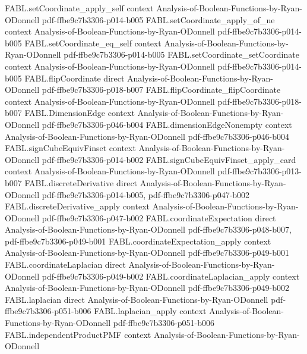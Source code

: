 \begin{theorem}
\proofstep
  {FABL.setCoordinate_apply_self}
  {context}
  {Analysis-of-Boolean-Functions-by-Ryan-ODonnell}
  {pdf-ffbe9c7b3306-p014-b005}
\proofstep
  {FABL.setCoordinate_apply_of_ne}
  {context}
  {Analysis-of-Boolean-Functions-by-Ryan-ODonnell}
  {pdf-ffbe9c7b3306-p014-b005}
\proofstep
  {FABL.setCoordinate_eq_self}
  {context}
  {Analysis-of-Boolean-Functions-by-Ryan-ODonnell}
  {pdf-ffbe9c7b3306-p014-b005}
\proofstep
  {FABL.setCoordinate_setCoordinate}
  {context}
  {Analysis-of-Boolean-Functions-by-Ryan-ODonnell}
  {pdf-ffbe9c7b3306-p014-b005}
\proofstep
  {FABL.flipCoordinate}
  {direct}
  {Analysis-of-Boolean-Functions-by-Ryan-ODonnell}
  {pdf-ffbe9c7b3306-p018-b007}
\proofstep
  {FABL.flipCoordinate_flipCoordinate}
  {context}
  {Analysis-of-Boolean-Functions-by-Ryan-ODonnell}
  {pdf-ffbe9c7b3306-p018-b007}
\proofstep
  {FABL.DimensionEdge}
  {context}
  {Analysis-of-Boolean-Functions-by-Ryan-ODonnell}
  {pdf-ffbe9c7b3306-p046-b004}
\proofstep
  {FABL.dimensionEdgeNonempty}
  {context}
  {Analysis-of-Boolean-Functions-by-Ryan-ODonnell}
  {pdf-ffbe9c7b3306-p046-b004}
\proofstep
  {FABL.signCubeEquivFinset}
  {context}
  {Analysis-of-Boolean-Functions-by-Ryan-ODonnell}
  {pdf-ffbe9c7b3306-p014-b002}
\proofstep
  {FABL.signCubeEquivFinset_apply_card}
  {context}
  {Analysis-of-Boolean-Functions-by-Ryan-ODonnell}
  {pdf-ffbe9c7b3306-p013-b007}
\proofstep
  {FABL.discreteDerivative}
  {direct}
  {Analysis-of-Boolean-Functions-by-Ryan-ODonnell}
  {pdf-ffbe9c7b3306-p014-b005,
    pdf-ffbe9c7b3306-p047-b002}
\proofstep
  {FABL.discreteDerivative_apply}
  {context}
  {Analysis-of-Boolean-Functions-by-Ryan-ODonnell}
  {pdf-ffbe9c7b3306-p047-b002}
\proofstep
  {FABL.coordinateExpectation}
  {direct}
  {Analysis-of-Boolean-Functions-by-Ryan-ODonnell}
  {pdf-ffbe9c7b3306-p048-b007,
    pdf-ffbe9c7b3306-p049-b001}
\proofstep
  {FABL.coordinateExpectation_apply}
  {context}
  {Analysis-of-Boolean-Functions-by-Ryan-ODonnell}
  {pdf-ffbe9c7b3306-p049-b001}
\proofstep
  {FABL.coordinateLaplacian}
  {direct}
  {Analysis-of-Boolean-Functions-by-Ryan-ODonnell}
  {pdf-ffbe9c7b3306-p049-b002}
\proofstep
  {FABL.coordinateLaplacian_apply}
  {context}
  {Analysis-of-Boolean-Functions-by-Ryan-ODonnell}
  {pdf-ffbe9c7b3306-p049-b002}
\proofstep
  {FABL.laplacian}
  {direct}
  {Analysis-of-Boolean-Functions-by-Ryan-ODonnell}
  {pdf-ffbe9c7b3306-p051-b006}
\proofstep
  {FABL.laplacian_apply}
  {context}
  {Analysis-of-Boolean-Functions-by-Ryan-ODonnell}
  {pdf-ffbe9c7b3306-p051-b006}
\proofstep
  {FABL.independentProductPMF}
  {context}
  {Analysis-of-Boolean-Functions-by-Ryan-ODonnell}

\end{theorem}
